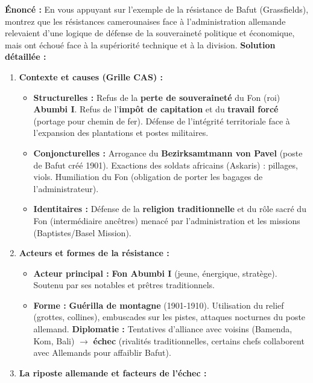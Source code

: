 \documentclass[11pt]{article}
\begin{document}
\begin{exoresolu}
\textbf{Énoncé :} En vous appuyant sur l'exemple de la résistance de Bafut (Grassfields), montrez que les résistances camerounaises face à l'administration allemande relevaient d'une logique de défense de la souveraineté politique et économique, mais ont échoué face à la supériorité technique et à la division.
\tcblower
\textbf{Solution détaillée :}
\begin{enumerate}
    \item \textbf{Contexte et causes (Grille CAS) :}
    \begin{itemize}
        \item \textbf{Structurelles :} Refus de la \textbf{perte de souveraineté} du Fon (roi) \textbf{Abumbi I}. Refus de l'\textbf{impôt de capitation} et du \textbf{travail forcé} (portage pour chemin de fer). Défense de l'intégrité territoriale face à l'expansion des plantations et postes militaires.
        \item \textbf{Conjoncturelles :} Arrogance du \textbf{Bezirksamtmann von Pavel} (poste de Bafut créé 1901). Exactions des soldats africains (Askaris) : pillages, viols. Humiliation du Fon (obligation de porter les bagages de l'administrateur).
        \item \textbf{Identitaires :} Défense de la \textbf{religion traditionnelle} et du rôle sacré du Fon (intermédiaire ancêtres) menacé par l'administration et les missions (Baptistes/Basel Mission).
    \end{itemize}
    \item \textbf{Acteurs et formes de la résistance :}
    \begin{itemize}
        \item \textbf{Acteur principal :} \textbf{Fon Abumbi I} (jeune, énergique, stratège). Soutenu par ses notables et prêtres traditionnels.
        \item \textbf{Forme :} \textbf{Guérilla de montagne} (1901-1910). Utilisation du relief (grottes, collines), embuscades sur les pistes, attaques nocturnes du poste allemand. \textbf{Diplomatie :} Tentatives d'alliance avec voisins (Bamenda, Kom, Bali) $\rightarrow$ \textbf{échec} (rivalités traditionnelles, certains chefs collaborent avec Allemands pour affaiblir Bafut).
    \end{itemize}
    \item \textbf{La riposte allemande et facteurs de l'échec :}
    \begin{itemize}

\end{itemize}
\end{enumerate}
\end{exoresolu}
\end{document}
